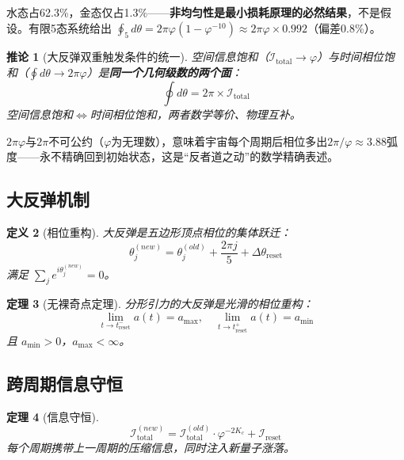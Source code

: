 \documentclass[12pt,a4paper,twocolumn]{article}
\renewcommand{\phi}{\varphi}
\newtheorem{theorem}{定理}[section]
\newtheorem{corollary}[theorem]{推论}
\newtheorem{definition}[theorem]{定义}
\begin{document}
水态占62.3\%，金态仅占1.3\%——\textbf{非均匀性是最小损耗原理的必然结果}，不是假设。有限5态系统给出 $\oint_5 d\theta = 2\pi\phi(1-\phi^{-10}) \approx 2\pi\phi \times 0.992$（偏差0.8\%）。

\begin{corollary}[大反弹双重触发条件的统一]
\label{cor:dual_trigger}
空间信息饱和（$\mathcal{I}_{\text{total}} \to \phi$）与时间相位饱和（$\oint d\theta \to 2\pi\phi$）是\textbf{同一个几何级数的两个面}：
\begin{equation}
\oint d\theta = 2\pi \times \mathcal{I}_{\text{total}}
\end{equation}
空间信息饱和$\Leftrightarrow$时间相位饱和，两者数学等价、物理互补。
\end{corollary}

$2\pi\phi$与$2\pi$不可公约（$\phi$为无理数），意味着宇宙每个周期后相位多出$2\pi/\phi \approx 3.88$弧度——永不精确回到初始状态，这是``反者道之动''的数学精确表述。

\subsection{大反弹机制}

\begin{definition}[相位重构]
大反弹是五边形顶点相位的集体跃迁：
\begin{equation}
\theta_j^{(new)} = \theta_j^{(old)} + \frac{2\pi j}{5} + \Delta\theta_{\text{reset}}
\end{equation}
满足 $\sum_j e^{i\theta_j^{(new)}} = 0$。
\end{definition}

\begin{theorem}[无裸奇点定理]
分形引力的大反弹是光滑的相位重构：
\begin{equation}
\lim_{t \to t_{\text{reset}}^-} a(t) = a_{\max}, \quad \lim_{t \to t_{\text{reset}}^+} a(t) = a_{\min}
\end{equation}
且 $a_{\min} > 0$，$a_{\max} < \infty$。
\end{theorem}

\subsection{跨周期信息守恒}

\begin{theorem}[信息守恒]
\begin{equation}
\mathcal{I}_{\text{total}}^{(new)} = \mathcal{I}_{\text{total}}^{(old)} \cdot \phi^{-2K_c} + \mathcal{I}_{\text{reset}}
\end{equation}
每个周期携带上一周期的压缩信息，同时注入新量子涨落。
\end{theorem}
\end{document}
